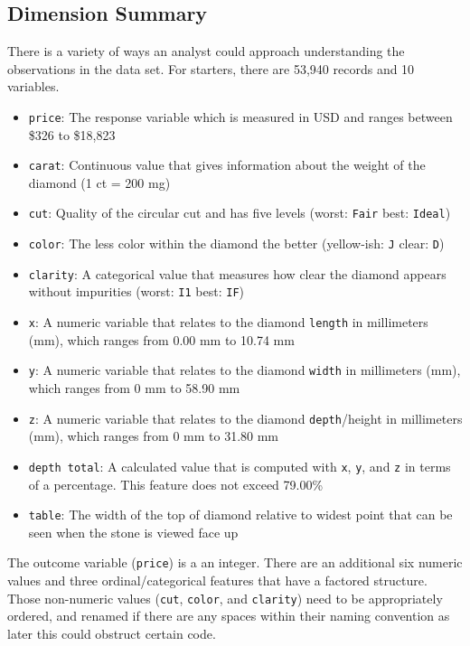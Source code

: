 \documentclass[
  paper=a4,
  ,captions=tableheading
]{scrartcl}
\begin{document}
\hypertarget{dimension-summary}{%
\subsection{Dimension Summary}\label{dimension-summary}}

There is a variety of ways an analyst could approach understanding the
observations in the data set. For starters, there are 53,940 records and
10 variables.

\begin{itemize}
\item
  \texttt{price}: The response variable which is measured in USD and
  ranges between \$326 to \$18,823
\item
  \texttt{carat}: Continuous value that gives information about the
  weight of the diamond (1 ct = 200 mg)
\item
  \texttt{cut}: Quality of the circular cut and has five levels (worst:
  \texttt{Fair} \textbar{} best: \texttt{Ideal})
\item
  \texttt{color}: The less color within the diamond the better
  (yellow-ish: \texttt{J} \textbar{} clear: \texttt{D})
\item
  \texttt{clarity}: A categorical value that measures how clear the
  diamond appears without impurities (worst: \texttt{I1} \textbar{}
  best: \texttt{IF})
\item
  \texttt{x}: A numeric variable that relates to the diamond
  \texttt{length} in millimeters (mm), which ranges from 0.00 mm to
  10.74 mm
\item
  \texttt{y}: A numeric variable that relates to the diamond
  \texttt{width} in millimeters (mm), which ranges from 0 mm to 58.90 mm
\item
  \texttt{z}: A numeric variable that relates to the diamond
  \texttt{depth}/height in millimeters (mm), which ranges from 0 mm to
  31.80 mm
\item
  \texttt{depth\ total}: A calculated value that is computed with
  \texttt{x}, \texttt{y}, and \texttt{z} in terms of a percentage. This
  feature does not exceed 79.00\%
\item
  \texttt{table}: The width of the top of diamond relative to widest
  point that can be seen when the stone is viewed face up
\end{itemize}

The outcome variable (\texttt{price}) is a an integer. There are an
additional six numeric values and three ordinal/categorical features
that have a factored structure. Those non-numeric values (\texttt{cut},
\texttt{color}, and \texttt{clarity}) need to be appropriately ordered,
and renamed if there are any spaces within their naming convention as
later this could obstruct certain code.
\end{document}
